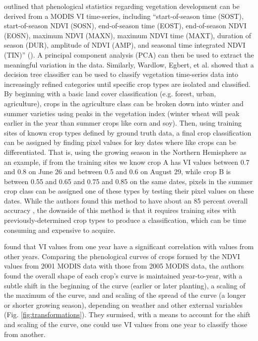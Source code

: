 \citeauthor{gu2010phenological} outlined that phenological statistics regarding vegetation development can be derived from a MODIS VI time-series, including “start-of-season time (SOST), start-of-season NDVI (SOSN), end-of-season time (EOST), end-of-season NDVI (EOSN), maximum NDVI (MAXN), maximum NDVI time (MAXT), duration of season (DUR), amplitude of NDVI (AMP), and seasonal time integrated NDVI (TIN)” \mkbibparens{\citeyear[529]{gu2010phenological}}. A principal component analysis (PCA) can then be used to extract the meaningful variation in the data. Similarly, Wardlow, Egbert, et al. \autocites{wardlow2002discriminating}{wardlow2005state-level}{wardlow2007analysis}{wardlow2008large-area} showed that a decision tree classifier can be used to classify vegetation time-series data into increasingly refined categories until specific crop types are isolated and classified. By beginning with a basic land cover classification (e.g. forest, urban, agriculture), crops in the agriculture class can be broken down into winter and summer varieties using peaks in the vegetation index (winter wheat will peak earlier in the year than summer crops like corn and soy). Then, using training sites of known crop types defined by ground truth data, a final crop classification can be assigned by finding pixel values for key dates where like crops can be differentiated. That is, using the growing season in the Northern Hemisphere as an example, if from the training sites we know crop A has VI values between 0.7 and 0.8 on June 26 and between 0.5 and 0.6 on August 29, while crop B is between 0.55 and 0.65 and 0.75 and 0.85 on the same dates, pixels in the summer crop class can be assigned one of these types by testing their pixel values on these dates. While the authors found this method to have about an 85 percent overall accuracy \autocite{wardlow2005state-level}, the downside of this method is that it requires training sites with previously-determined crop types to produce a classification, which can be time consuming and expensive to acquire.

\textcite{masialeti2010a-comparative} found that VI values from one year have a significant correlation with values from other years. Comparing the phenological curves of crops formed by the NDVI values from 2001 MODIS data \autocite[from][]{wardlow2005state-level} with those from 2005 MODIS data, the authors found the overall shape of each crop's curve is maintained year-to-year, with a subtle shift in the beginning of the curve (earlier or later planting), a scaling of the maximum of the curve, and and scaling of the spread of the curve (a longer or shorter growing season), depending on weather and other external variables (Fig. \ref{fig:transformations}). They surmised, with a means to account for the shift and scaling of the curve, one could use VI values from one year to classify those from another.

